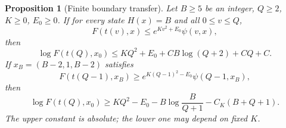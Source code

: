 \documentclass[11pt,letterpaper]{article}
\newtheorem{proposition}[theorem]{Proposition}
\theoremstyle{remark}
\begin{document}
\begin{proposition}[Finite boundary transfer]\label{a58:ln:prop:transfer}
Let $B\ge5$ be an integer, $Q\ge2$, $K\ge0$, $E_0\ge0$.
If for every state $H(x)=B$ and all $0\le v\le Q$,
\begin{equation}\label{a58:ln:eq:upperhyp}
 F(t(v),x)\le e^{Kv^2+E_0}\psi(v,x),
\end{equation}
then
\begin{equation}\label{a58:ln:eq:rootupper}
 \log F(t(Q),x_0)\le KQ^2+E_0+CB\log(Q+2)+CQ+C.
\end{equation}
If $x_B=(B-2,1,B-2)$ satisfies
\begin{equation}\label{a58:ln:eq:lowerhyp}
 F(t(Q-1),x_B)\ge e^{K(Q-1)^2-E_0}\psi(Q-1,x_B),
\end{equation}
then
\begin{equation}\label{a58:ln:eq:rootlower}
 \log F(t(Q),x_0)\ge KQ^2-E_0-B\log\frac B{Q+1}
                                  -C_K(B+Q+1).
\end{equation}
The upper constant is absolute; the lower one may depend on fixed $K$.
\end{proposition}
\end{document}
